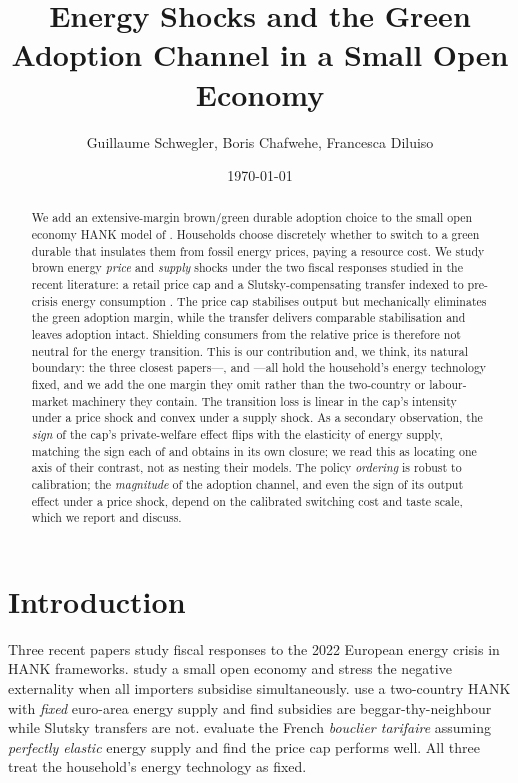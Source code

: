 \documentclass[11pt,a4paper]{article}
\title{\textbf{Energy Shocks and the Green Adoption Channel in a Small Open Economy}}
\author{Guillaume Schwegler, Boris Chafwehe, Francesca Diluiso}
\date{\today}
\begin{document}
\maketitle

\begin{abstract}
\noindent We add an extensive-margin brown/green durable adoption choice to the
small open economy HANK model of \citet{ARS2024}. Households choose discretely
whether to switch to a green durable that insulates them from fossil energy
prices, paying a resource cost. We study brown energy \emph{price} and
\emph{supply} shocks under the two fiscal responses studied in the recent
literature: a retail price cap \citep{Langot2026} and a Slutsky-compensating
transfer indexed to pre-crisis energy consumption \citep{Bayer2026}. The price
cap stabilises output but mechanically eliminates the green adoption margin,
while the transfer delivers comparable stabilisation and leaves adoption
intact. Shielding consumers from the relative price is therefore not neutral
for the energy transition. This is our contribution and, we think, its natural
boundary: the three closest papers---\citet{ARS2024}, \citet{Bayer2026} and
\citet{Langot2026}---all hold the household's energy technology fixed, and we
add the one margin they omit rather than the two-country or labour-market
machinery they contain. The transition loss is linear in the cap's intensity
under a price shock and convex under a supply shock. As a secondary
observation, the \emph{sign} of the cap's private-welfare effect flips with the
elasticity of energy supply, matching the sign each of \citet{Langot2026} and
\citet{Bayer2026} obtains in its own closure; we read this as locating one axis
of their contrast, not as nesting their models. The policy \emph{ordering} is
robust to calibration; the \emph{magnitude} of the adoption channel, and even
the sign of its output effect under a price shock, depend on the calibrated
switching cost and taste scale, which we report and discuss.
\end{abstract}

\section{Introduction}

Three recent papers study fiscal responses to the 2022 European energy crisis
in HANK frameworks. \citet{ARS2024} study a small open economy and stress the
negative externality when all importers subsidise simultaneously.
\citet{Bayer2026} use a two-country HANK with \emph{fixed} euro-area energy
supply and find subsidies are beggar-thy-neighbour while Slutsky transfers are
not. \citet{Langot2026} evaluate the French \emph{bouclier tarifaire} assuming
\emph{perfectly elastic} energy supply and find the price cap performs well.
All three treat the household's energy technology as fixed.
\end{document}

